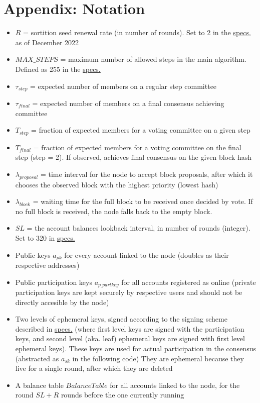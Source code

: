 \documentclass[10pt,a4paper]{article}
\begin{document}
\section*{Appendix: Notation}


\begin{itemize}
    \item $R$ = sortition seed renewal rate (in number of rounds). 
    Set to 2 in the \href{https://github.com/algorandfoundation/specs}{specs.}
    as of December 2022
    \item $MAX\_STEPS$ = maximum number of allowed steps in the main algorithm. Defined 
    as 255 in the \href{https://github.com/algorandfoundation/specs}{specs.}
    \item $\tau_{step}$ = expected number of members on a regular step committee
    \item $\tau_{final}$ = expected number of members on a final consensus achieving committee
    \item $T_{step}$ = fraction of expected members for a voting committee on a given step
    \item $T_{final}$ = fraction of expected members for a voting committee on the final step (step = 2). 
    If observed, achieves final consensus on the given block hash
    \item $\lambda_{proposal}$ = time interval for the node to accept block proposals, after
    which it chooses the observed block with the highest priority (lowest hash) 
    \item $\lambda_{block}$ = waiting time for the full block to be received once decided by vote.
    If no full block is received, the node falls back to the empty block.
    \item $SL$ = the account balances lookback interval, in number of rounds (integer). 
    Set to 320 in \href{https://github.com/algorandfoundation/specs}{specs.}
    \item Public keys $a_{pk}$ for every account linked to the node (doubles as their respective addresses)
    \item Public participation keys $a_{p\_partkey}$ for all accounts registered as online (private participation keys are kept
    securely by respective users and should not be directly accesible by the node)
    \item Two levels of ephemeral keys, signed according to the signing scheme described in \href{https://github.com/algorandfoundation/specs}{specs.} (where 
    first level keys are signed with the participation keys, and second level (aka. leaf) ephemeral keys are signed with 
    first level ephemeral keys). 
    These keys are used for actual participation in the consensus (abstracted as $a_{sk}$ in the following code)
    They are ephemeral because they live for a single round, after which they are deleted
    \item A balance table $BalanceTable$ for all accounts linked to the node, for the round $SL + R$ rounds before the one 
    currently running
\end{itemize}






\end{document}
